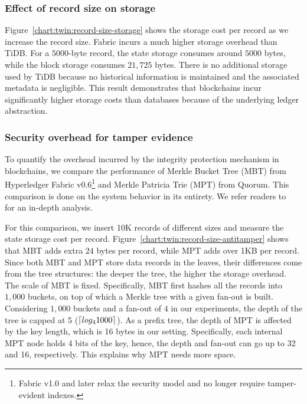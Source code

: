  \subsubsection{Effect of record size on storage}

Figure~\ref{chart:twin:record-size-storage} shows the storage cost per record as we
increase the record size.
Fabric incurs a much higher storage overhead than TiDB.
For a $5000$-byte record, the state storage consumes around $5000$ bytes, while
the block storage consumes $21,725$ bytes.
There is no additional storage used by TiDB because no historical information is
maintained and the associated metadata is negligible.
This result demonstrates that blockchains incur significantly higher storage
costs than databases because of the underlying ledger abstraction.

\subsubsection{Security overhead for tamper evidence}
\label{ch:twin:exp:storage:tamper}

To quantify the overhead incurred by the integrity protection mechanism in
blockchains, we compare the performance of Merkle Bucket Tree (MBT) from
Hyperledger Fabric v0.6\footnote{Fabric v1.0 and later relax the security model
and no longer require tamper-evident indexes.} and Merkle Patricia Trie (MPT)
from Quorum.
This comparison is done on the system behavior in its entirety. We
refer readers to~\cite{yue2020analysis} for an in-depth analysis.

For this comparison, we insert 10K records of different sizes and measure the
state storage cost per record. 
Figure~\ref{chart:twin:record-size-antitamper} shows
that MBT adds extra $24$ bytes per record, while MPT adds over 1KB per record.
Since both MBT and MPT store data records in the leaves, their differences come
from the tree structures: the deeper the tree, the higher the storage overhead.
The scale of MBT is fixed.
Specifically, MBT first hashes all the records into $1,000$ buckets, on top of
which a Merkle tree with a given fan-out is built.
Considering $1,000$ buckets and a fan-out of $4$ in our experiments, the depth
of the tree is capped at 5 ($\lceil log_4 1000\rceil$).
As a prefix tree, the depth of MPT is affected by the key length, which is 16
bytes in our setting.
Specifically, each internal MPT node holds 4 bits of the key, hence, the depth
and fan-out can go up to 32 and 16, respectively.
This explains why MPT needs more space.


